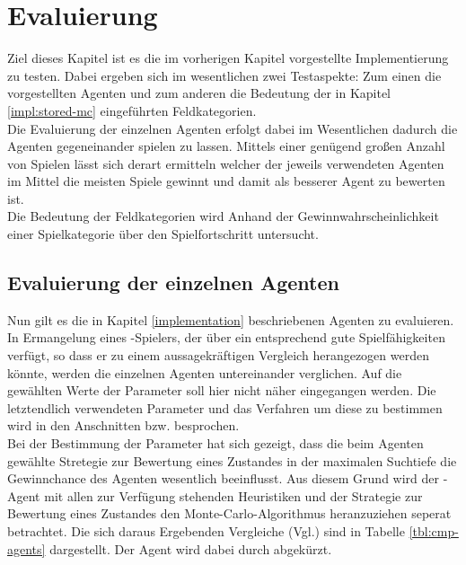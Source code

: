 \chapter{Evaluierung}
Ziel dieses Kapitel ist es die im vorherigen Kapitel vorgestellte Implementierung zu testen. Dabei ergeben sich im wesentlichen zwei Testaspekte: Zum einen die vorgestellten Agenten und zum anderen die Bedeutung der in Kapitel \ref{impl:stored-mc} eingeführten Feldkategorien.
\vspace{0.5cm}
\\Die Evaluierung der einzelnen Agenten erfolgt dabei im Wesentlichen dadurch die Agenten gegeneinander spielen zu lassen. Mittels einer genügend großen Anzahl von Spielen lässt sich derart ermitteln welcher der jeweils verwendeten Agenten im Mittel die meisten Spiele gewinnt und damit als besserer Agent zu bewerten ist.
\\Die Bedeutung der Feldkategorien wird Anhand der Gewinnwahrscheinlichkeit einer Spielkategorie über den Spielfortschritt untersucht.
\section{Evaluierung der einzelnen Agenten}
\label{cpt:eval-agents}
Nun gilt es die in Kapitel \ref{implementation} beschriebenen Agenten zu evaluieren. In Ermangelung eines \ot-Spielers, der über ein entsprechend gute Spielfähigkeiten verfügt, so dass er zu einem aussagekräftigen Vergleich herangezogen werden könnte, werden die einzelnen Agenten untereinander verglichen. Auf die gewählten Werte der Parameter soll hier nicht näher eingegangen werden. Die letztendlich verwendeten Parameter und das Verfahren um diese zu bestimmen wird in den Anschnitten  bzw.  besprochen.
\\Bei der Bestimmung der Parameter hat sich gezeigt, dass die beim Agenten \mxZitat{\abp} gewählte Stretegie zur Bewertung eines Zustandes in der maximalen Suchtiefe die Gewinnchance des Agenten wesentlich beeinflusst. Aus diesem Grund wird der \mxZitat{\abp}-Agent mit allen zur Verfügung stehenden Heuristiken und der Strategie zur Bewertung eines Zustandes den Monte-Carlo-Algorithmus heranzuziehen seperat betrachtet. Die sich daraus Ergebenden Vergleiche (Vgl.) sind in Tabelle \ref{tbl:cmp-agents} dargestellt. Der Agent \mxZitat{\abp} wird dabei durch  abgekürzt.

